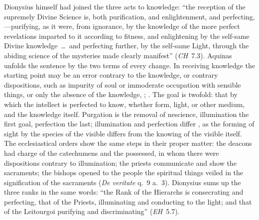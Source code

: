 Dionysius himself had joined the three acts to knowledge: ``the reception of
the supremely Divine Science is, both purification, and enlightenment, and
perfecting,---purifying, as it were, from ignorance, by the knowledge of
the more perfect revelations imparted to it according to fitness, and
enlightening by the self-same Divine knowledge~\dots\ and perfecting further,
by the self-same Light, through the abiding science of the mysteries made
clearly manifest'' (\emph{CH}~7.3). Aquinas unfolds the sentence by the two
terms of every change. In receiving knowledge the starting point may be an
error contrary to the knowledge, or contrary dispositions, such as
impurity of soul or immoderate occupation with sensible things, or only the
absence of the knowledge, ; . The goal is twofold: that by which the intellect is perfected to
know, whether form, light, or other medium, and the knowledge itself.
Purgation is the removal of nescience, illumination the first goal,
perfection the last; illumination and perfection differ , as the
forming of sight by the species of the visible differs from the knowing of
the visible itself. The ecclesiastical orders show the same
steps in their proper matter: the deacons had charge of the catechumens and
the possessed, in whom there were dispositions contrary to illumination;
the priests communicate and show the sacraments; the bishops opened to the
people the spiritual things veiled in the signification of the sacraments
(\emph{De veritate} q.~9 a.~3). Dionysius sums up the three ranks in the
same words: ``the Rank of the Hierarchs is consecrating and perfecting, that
of the Priests, illuminating and conducting to the light; and that of the
Leitourgoi purifying and discriminating'' (\emph{EH}~5.7).

